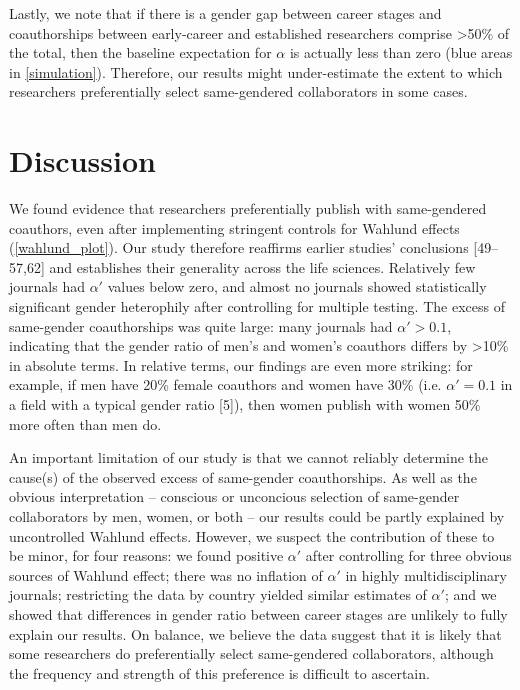 \documentclass[12pt,]{article}
\begin{document}
Lastly, we note that if there is a gender gap between career stages and
coauthorships between early-career and established researchers comprise
\textgreater{}50\% of the total, then the baseline expectation for
\(\alpha\) is actually less than zero (blue areas in
\autoref{simulation}). Therefore, our results might under-estimate the
extent to which researchers preferentially select same-gendered
collaborators in some cases.

\section{Discussion}\label{discussion}

We found evidence that researchers preferentially publish with
same-gendered coauthors, even after implementing stringent controls for
Wahlund effects (\autoref{wahlund_plot}). Our study therefore reaffirms
earlier studies' conclusions {[}49--57,62{]} and establishes their
generality across the life sciences. Relatively few journals had
\(\alpha'\) values below zero, and almost no journals showed
statistically significant gender heterophily after controlling for
multiple testing. The excess of same-gender coauthorships was quite
large: many journals had \(\alpha' > 0.1\), indicating that the gender
ratio of men's and women's coauthors differs by \textgreater{}10\% in
absolute terms. In relative terms, our findings are even more striking:
for example, if men have 20\% female coauthors and women have 30\% (i.e.
\(\alpha' = 0.1\) in a field with a typical gender ratio {[}5{]}), then
women publish with women 50\% more often than men do.

An important limitation of our study is that we cannot reliably
determine the cause(s) of the observed excess of same-gender
coauthorships. As well as the obvious interpretation -- conscious or
unconcious selection of same-gender collaborators by men, women, or both
-- our results could be partly explained by uncontrolled Wahlund
effects. However, we suspect the contribution of these to be minor, for
four reasons: we found positive \(\alpha'\) after controlling for three
obvious sources of Wahlund effect; there was no inflation of \(\alpha'\)
in highly multidisciplinary journals; restricting the data by country
yielded similar estimates of \(\alpha'\); and we showed that differences
in gender ratio between career stages are unlikely to fully explain our
results. On balance, we believe the data suggest that it is likely that
some researchers do preferentially select same-gendered collaborators,
although the frequency and strength of this preference is difficult to
ascertain.
\end{document}
